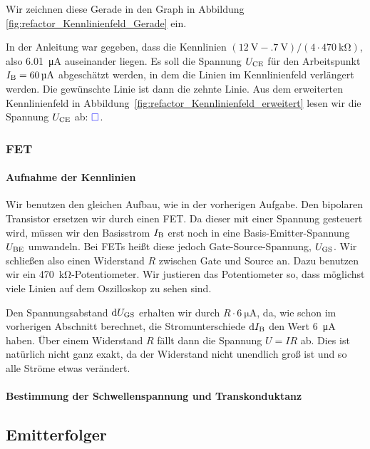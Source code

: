 Wir zeichnen diese Gerade in den Graph in Abbildung
\ref{fig:refactor_Kennlinienfeld_Gerade} ein.

In der Anleitung war gegeben, dass die Kennlinien $(\SI{12}\volt -
\SI{.7}\volt)/(4 \cdot \SI{470}{\kilo\ohm})$, also \SI{6.01}{\micro\ampere}
auseinander liegen. Es soll die Spannung $U_\text{CE}$ für den Arbeitspunkt $I_\text{B} =
\SI{60}{\micro\ampere}$ abgeschätzt werden, in dem die Linien im Kennlinienfeld
verlängert werden. Die gewünschte Linie ist dann die zehnte Linie. Aus dem
erweiterten Kennlinienfeld in
Abbildung~\ref{fig:refactor_Kennlinienfeld_erweitert} lesen wir die Spannung
$U_\text{CE}$ ab: $\textcolor{blue}{\square}$.

\subsubsection{FET}

\paragraph{Aufnahme der Kennlinien}

Wir benutzen den gleichen Aufbau, wie in der vorherigen Aufgabe. Den bipolaren
Transistor ersetzen wir durch einen FET. Da dieser mit einer Spannung gesteuert
wird, müssen wir den Basisstrom $I_\text{B}$ erst noch in eine Basis-Emitter-Spannung
$U_\text{BE}$ umwandeln. Bei FETs heißt diese jedoch Gate-Source-Spannung, $U_\text{GS}$. Wir
schließen also einen Widerstand $R$ zwischen Gate und Source an. Dazu benutzen
wir ein \SI{470}{\kilo\ohm}-Potentiometer. Wir justieren das Potentiometer so,
dass möglichst viele Linien auf dem Oszilloskop zu sehen sind.

Den Spannungsabstand $\dif\UGS$ erhalten wir durch $R \cdot
\SI{6}{\micro\ampere}$, da, wie schon im vorherigen Abschnitt berechnet, die
Stromunterschiede $\dif\IB$ den Wert \SI{6}{\micro\ampere} haben. Über einem
Widerstand $R$ fällt dann die Spannung $U = IR$ ab. Dies ist natürlich nicht
ganz exakt, da der Widerstand nicht unendlich groß ist und so alle Ströme etwas
verändert.

\paragraph{Bestimmung der Schwellenspannung und Transkonduktanz}
\label{par:Schwellenspannung}

\fehlt

\FloatBarrier
\subsection{Emitterfolger}

